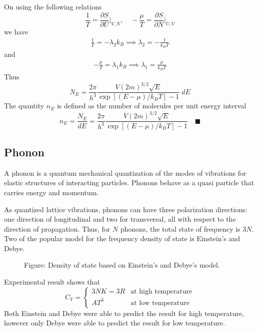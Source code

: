 \documentclass[../../../Main.tex]{subfiles}
\begin{document}
On using the following relations
\begin{equation*}
    \frac{1}{T}=\frac{\partial S}{\partial U}\bigg|_{V,N},\quad -\frac{\mu}{T}=\frac{\partial S}{\partial N}\bigg|_{U,V}
\end{equation*}
we have 
\begin{align*}
    \frac{1}{T}=-\lambda_2k_B\implies
    \lambda_2=-\frac{1}{k_BT}
\end{align*}
and
\begin{align*}
    -\frac{\mu}{T}=\lambda_1k_B\implies
    \lambda_1=\frac{\mu}{k_BT}
\end{align*}
Thus
\begin{equation*}
    N_E=\frac{2\pi}{h^3} \frac{V (2m)^{3/2}\sqrt{E}}{\exp\left[(E-\mu)/k_BT\right]-1} \;dE
\end{equation*}
The quantity $n_E$ is defined as the number of molecules per unit energy interval
\begin{equation*}
    n_E=\frac{N_E}{dE}=\frac{2\pi}{h^3} \frac{V (2m)^{3/2}\sqrt{E}}{\exp\left[(E-\mu)/k_BT\right]-1} \quad\blacksquare
\end{equation*}
 
\subsection{Phonon}
A phonon is a quantum mechanical quantization of the modes of vibrations for elastic structures of interacting particles. Phonons behave as a quasi particle that carries energy and momentum. 

As quantized lattice vibrations, phonons can have three polarization directions: one direction of longitudinal and two for transversal, all with respect to the direction of propagation. Thus, for $N$ phonons, the total state of frequency is $3N$. Two of the popular model for the frequency density of state is Einstein's and Debye.
\begin{figure*}
    \centering
    \caption*{Figure: Density of state based on Einstein's and Debye's model.}
\end{figure*}

Experimental result shows that
\begin{equation*}
    C_V=\begin{cases}
        3NK=3R&\text{at high temperature}\\
        AT^3&\text{at low temperature}
    \end{cases}
\end{equation*}
Both Einstein and Debye were able to predict the result for high temperature, however only Debye were able to predict the result for low temperature.
\end{document}
